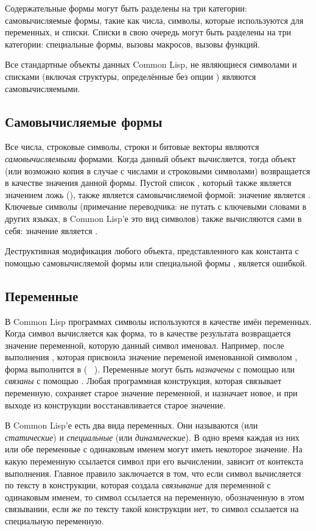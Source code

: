 Содержательные формы могут быть разделены на три категории:
самовычисляемые формы, такие как числа,
символы, которые используются для переменных,
и списки. Списки в свою очередь могут быть разделены на три категории:
специальные формы, 
вызовы макросов,
вызовы функций.

Все стандартные объекты данных Common Lisp, не являющиеся символами и списками
(включая  структуры, определённые без опции ) являются
самовычисляемыми. 

\subsection{Самовычисляемые формы}

Все числа, строковые символы, строки и битовые векторы являются
\emph{самовычисляемыми} формами.
Когда данный объект вычисляется, тогда объект (или возможно копия в случае с
числами и строковыми символами) возвращается в качестве значения данной
формы. Пустой список {\emptylist}, который также является значением ложь
({\false}), также является самовычисляемой формой: значение {\false} является
{\false}.
Ключевые символы (примечание переводчика: не путать с ключевыми словами в других
языках, в Common Lisp'е это вид символов) также вычисляются сами в себя:
значение  является .

Деструктивная модификация любого объекта, представленного как
константа с помощью самовычисляемой формы или специальной формы ,
является ошибкой.

\subsection{Переменные}

В Common Lisp программах символы используются в качестве имён переменных.
Когда символ вычисляется как форма, то в качестве результата возвращается
значение переменной, которую данный символ именовал. Например, после выполнения
, которая присвоила значение  переменой именованной
символом , форма  выполнится в  ( \EV\
).
Переменные могут быть \emph{назначены} с помощью  или \emph{связаны} с
помощью \cdf{let}.
Любая программная конструкция, которая связывает переменную, сохраняет старое
значение переменной, и назначает новое, и при выходе из конструкции
восстанавливается старое значение.

В Common Lisp'е есть два вида переменных. Они называются  (или
\emph{статические}) и \emph{специальные} (или \emph{динамические}).
В одно время каждая из них или обе переменные с одинаковым именем могут иметь
некоторое значение. На какую переменную ссылается символ при его вычислении,
зависит от контекста выполнения. Главное правило заключается в том, что если
символ вычисляется по тексту в конструкции, которая создала \emph{связывание} для
переменной с одинаковым именем, то символ ссылается на переменную, обозначенную
в этом связывании, если же по тексту такой конструкции нет, то символ ссылается
на специальную переменную.

